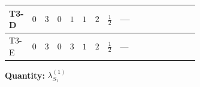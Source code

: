 \documentclass[8pt]{article}
\begin{document}
\begin{landscape}
\begin{longtable}{@{}llcccccc >{\raggedright\arraybackslash}p{0.21\linewidth} >{\raggedright\arraybackslash}p{0.21\linewidth} >{\raggedright\arraybackslash}p{0.21\linewidth}@{}}
\midrule
T3-D & $0$ & $3$ & $0$ & $1$ & $1$ & $2$ & $\frac{1}{2}$ & --- & \scriptsize\adjustbox{max width=\linewidth}{$\begin{gathered} 21 {g_2}^4\end{gathered}$} & \scriptsize\adjustbox{max width=\linewidth}{$\begin{gathered} +{g_2}^2 (-24 {\lambda_{S_1}^{(1)}}-12 {\lambda_{S_1}^{(A)}})\end{gathered}$} \\
\midrule
T3-E & $0$ & $3$ & $0$ & $3$ & $1$ & $2$ & $\frac{1}{2}$ & --- & \scriptsize\adjustbox{max width=\linewidth}{$\begin{gathered} 21 {g_2}^4\end{gathered}$} & \scriptsize\adjustbox{max width=\linewidth}{$\begin{gathered} +{g_2}^2 (-24 {\lambda_{S_1}^{(1)}}-12 {\lambda_{S_1}^{(A)}})\end{gathered}$} \\
\midrule
\bottomrule
\end{longtable}
\clearpage
\noindent\textbf{Quantity: }$\lambda_{S_1}^{(1)}$\par\smallskip

\end{landscape}
\end{document}
